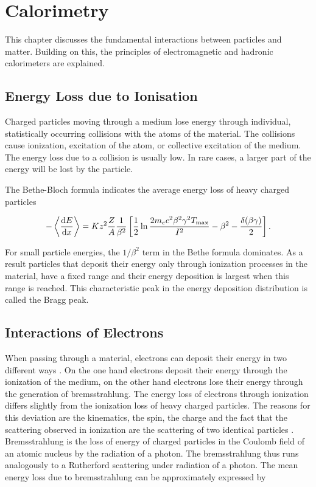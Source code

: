 \documentclass[12pt, a4paper]{thesis}
\begin{document}
\chapter{Calorimetry}
\label{sec:org802b29d}

This chapter discusses the fundamental interactions between particles
and matter. Building on this, the principles of electromagnetic and
hadronic calorimeters are explained.

\section{Energy Loss due to Ionisation}
\label{sec:org57bbfcf}

Charged particles moving through a medium lose energy through
individual, statistically occurring collisions with the atoms of the
material. The collisions cause ionization, excitation of the atom, or
collective excitation of the medium.  The energy loss due to a
collision is usually low. In rare cases, a larger part of the energy
will be lost by the particle.

The Bethe-Bloch formula indicates the average energy loss of heavy
charged particles

\begin{align}
  -\expval{\dv{E}{x}} = K z^2 \frac{Z}{A} \frac{1}{\beta^{2}} \left[ \frac{1}{2} \ln{\frac{2 m_{e} c^{2} \beta^{2} \gamma^{2} T_{\text{max}}}{I^{2}}}-\beta^{2} - \frac{\delta(\beta\gamma)}{2}\right].
\end{align}

For small particle energies, the \(1/\beta^2\) term in the Bethe
formula dominates. As a result particles that deposit their energy
only through ionization processes in the material, have a fixed range
and their energy deposition is largest when this range is
reached. This characteristic peak in the energy deposition
distribution is called the Bragg peak.

\clearpage
\section{Interactions of Electrons}
\label{sec:org978e80c}

When passing through a material, electrons can deposit their energy in
two different ways \cite{kolanoski16}. On the one hand electrons
deposit their energy through the ionization of the medium, on the
other hand electrons lose their energy through the generation of
bremsstrahlung.  The energy loss of electrons through ionization
differs slightly from the ionization loss of heavy charged
particles. The reasons for this deviation are the kinematics, the
spin, the charge and the fact that the scattering observed in
ionization are the scattering of two identical particles
\cite{PhysRevD.98.030001}. Bremsstrahlung is the loss of energy of
charged particles in the Coulomb field of an atomic nucleus by the
radiation of a photon. The bremsstrahlung thus runs analogously to a
Rutherford scattering under radiation of a photon.  The mean energy
loss due to bremsstrahlung can be approximately expressed by
\end{document}
